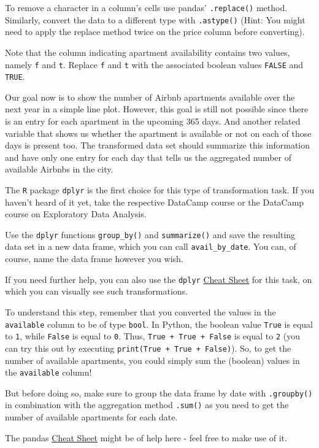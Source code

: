 \documentclass[
  11pt,
]{article}
\newenvironment{tips}[1]
  {
  \begin{itemize}
  \footnotesize
  \renewcommand{\labelitemi}{
    \raisebox{-.7\height}[0pt][0pt]{
      {\setkeys{Gin}{width=3em,keepaspectratio}
        \texttt{[image: images/\#1.png]}}
    }
  }
  \setlength{\fboxsep}{1em}
  \begin{rbox}
  \item
  }
  {
  \end{rbox}
  \end{itemize}
  }
\newenvironment{tipsp}[1]
  {
  \begin{itemize}
  \footnotesize
  \renewcommand{\labelitemi}{
    \raisebox{-.7\height}[0pt][0pt]{
      {\setkeys{Gin}{width=3em,keepaspectratio}
        \texttt{[image: images/\#1.png]}}
    }
  }
  \setlength{\fboxsep}{1em}
  \begin{pbox}
  \item
  }
  {
  \end{pbox}
  \end{itemize}
  }
\begin{document}
\begin{tipsp}p
To remove a character in a column's cells use pandas' \texttt{.replace()} method.
Similarly, convert the data to a different type with \texttt{.astype()} (Hint: You might need to apply the replace method twice on the price column before converting).

Note that the column indicating apartment availability contains two values, namely \texttt{f} and \texttt{t}.
Replace \texttt{f} and \texttt{t} with the associated boolean values \texttt{FALSE} and \texttt{TRUE}.

\end{tipsp}

Our goal now is to show the number of Airbnb apartments available over the next year in a simple line plot.
However, this goal is still not possible since there is an entry for each apartment in the upcoming 365 days.
And another related variable that shows us whether the apartment is available or not on each of those days is present too.
The transformed data set should summarize this information and have only one entry for each day that tells us the aggregated number of available Airbnbs in the city.

\begin{tips}r
The \texttt{R} package \texttt{dplyr} is the first choice for this type of transformation task.
If you haven't heard of it yet, take the respective DataCamp course or the DataCamp course on Exploratory Data Analysis.

Use the \texttt{dplyr} functions \texttt{group\_by()} and \texttt{summarize()} and save the resulting data set in a new data frame, which you can call \texttt{avail\_by\_date}.
You can, of course, name the data frame however you wish.

If you need further help, you can also use the \texttt{dplyr} \href{https://www.rstudio.com/wp-content/uploads/2015/02/data-wrangling-cheatsheet.pdf}{Cheat Sheet} for this task, on which you can visually see such transformations.

\end{tips}

\begin{tipsp}p
To understand this step, remember that you converted the values in the \texttt{available} column to be of type \texttt{bool}.
In Python, the boolean value \texttt{True} is equal to \texttt{1}, while \texttt{False} is equal to \texttt{0}.
Thus, \texttt{True\ +\ True\ +\ False} is equal to \texttt{2} (you can try this out by executing \texttt{print(True\ +\ True\ +\ False)}).
So, to get the number of available apartments, you could simply sum the (boolean) values in the \texttt{available} column!

But before doing so, make sure to group the data frame by date with \texttt{.groupby()} in combination with the aggregation method \texttt{.sum()} as you need to get the number of available apartments for each date.

The pandas \href{https://pandas.pydata.org/Pandas_Cheat_Sheet.pdf}{Cheat Sheet} might be of help here - feel free to make use of it.

\end{tipsp}
\end{document}
